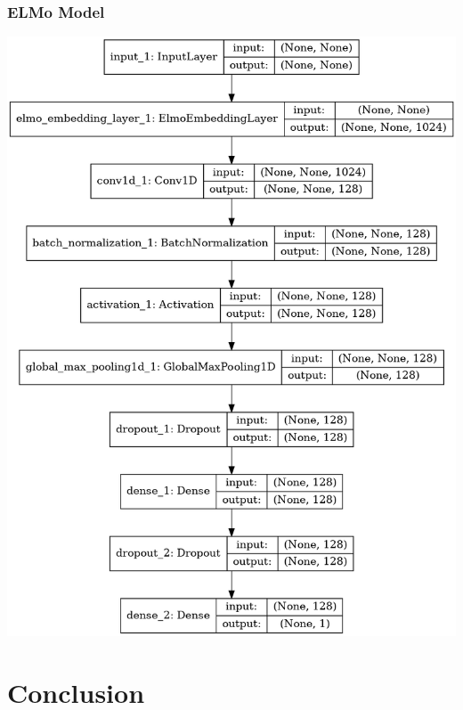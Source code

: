 \documentclass{beamer}
\begin{document}
\begin{frame}
    \frametitle{ELMo Model}
    \includegraphics[scale=0.2]{elmo_model.png}
\end{frame}


\section{Conclusion}
\end{document}
